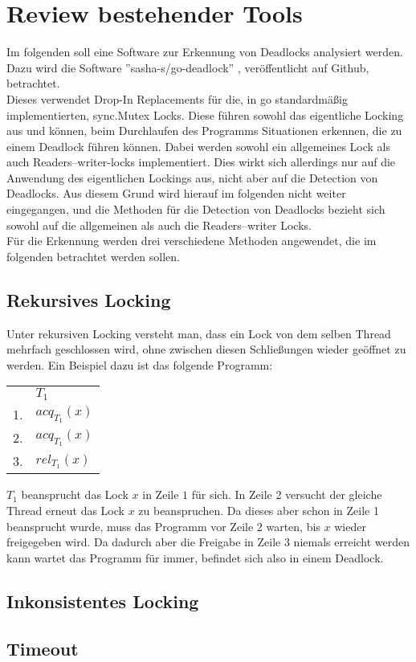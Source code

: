 \chapter{Review bestehender Tools}
Im folgenden soll eine Software zur Erkennung von Deadlocks analysiert werden.
Dazu wird die Software ''sasha-s/go-deadlock'' \cite{sasha-s}, veröffentlicht 
auf Github, betrachtet.\\
Dieses verwendet Drop-In Replacements für die, in go standardmäßig 
implementierten, sync.Mutex Locks. Diese führen sowohl das eigentliche 
Locking aus und können, beim Durchlaufen des Programms Situationen erkennen, 
die zu einem Deadlock führen können. Dabei werden sowohl ein allgemeines Lock 
als auch Readers–writer-locks implementiert. Dies wirkt sich allerdings nur auf
die Anwendung des eigentlichen Lockings aus, nicht aber auf die Detection von 
Deadlocks. Aus diesem Grund wird hierauf im folgenden nicht weiter eingegangen, 
und die Methoden für die Detection von Deadlocks bezieht sich sowohl auf die
allgemeinen als auch die Readers–writer Locks.\\
Für die Erkennung werden drei verschiedene Methoden angewendet, die im folgenden
betrachtet werden sollen.
\section{Rekursives Locking}
Unter rekursiven Locking versteht man, dass ein Lock von dem selben Thread 
mehrfach geschlossen wird, ohne zwischen diesen Schließungen wieder geöffnet zu
werden. Ein Beispiel dazu ist das folgende Programm:
\begin{table}[H]
    \centering
    \begin{tabular}{ll}
       & $T_1$          \\
    1. & $acq_{T_1}(x)$ \\
    2. & $acq_{T_1}(x)$ \\
    3. & $rel_{T_1}(x)$
    \end{tabular}
\end{table}
$T_1$ beansprucht das Lock $x$ in Zeile $1$ für sich. In Zeile 2 versucht der 
gleiche Thread erneut das Lock $x$ zu beanspruchen. Da dieses aber schon in 
Zeile 1 beansprucht wurde, muss das Programm vor Zeile 2 warten, bis $x$ wieder 
freigegeben wird. Da dadurch aber die Freigabe in Zeile 3 niemals erreicht werden
kann wartet das Programm für immer, befindet sich also in einem Deadlock.



\section{Inkonsistentes Locking}

\section{Timeout}
